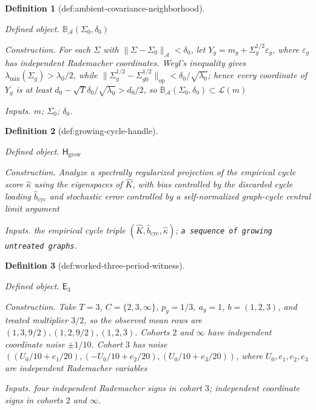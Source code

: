\documentclass{article}
\newtheorem{definition}{Definition}
\begin{document}
\begin{definition}[def:ambient-covariance-neighborhood]\label{def:ambient-covariance-neighborhood}
\par\smallskip\noindent\emph{Defined object.} \(\mathbb B_{\mathcal A}(\Sigma_0,\delta_0)\)
\par\smallskip\noindent\emph{Construction.} For each \(\Sigma\) with \(\|\Sigma-\Sigma_0\|_{\mathcal A}<\delta_0\), let \(Y_g=m_g+\Sigma_g^{1/2}\varepsilon_g\), where \(\varepsilon_g\) has independent Rademacher coordinates. Weyl's inequality gives \(\lambda_{\min}(\Sigma_g)>\lambda_0/2\), while \(\|\Sigma_g^{1/2}-\Sigma_{g0}^{1/2}\|_{\mathrm{op}}<\delta_0/\sqrt{\lambda_0}\); hence every coordinate of \(Y_g\) is at least \(d_0-\sqrt T\delta_0/\sqrt{\lambda_0}>d_0/2\), so \(\mathbb B_{\mathcal A}(\Sigma_0,\delta_0)\subset\mathcal L(m)\)
\par\smallskip\noindent\emph{Inputs.} \(m\); \(\Sigma_0\); \(\delta_0\).
\end{definition}

\begin{definition}[def:growing-cycle-handle]\label{def:growing-cycle-handle}
\par\smallskip\noindent\emph{Defined object.} \(\mathsf H_{\mathrm{grow}}\)
\par\smallskip\noindent\emph{Construction.} Analyze a spectrally regularized projection of the empirical cycle score \(\widehat\kappa\) using the eigenspaces of \(\widehat K\), with bias controlled by the discarded cycle loading \(\widehat b_{\mathrm{cyc}}\) and stochastic error controlled by a self-normalized graph-cycle central limit argument
\par\smallskip\noindent\emph{Inputs.} the empirical cycle triple \((\widehat K,\widehat b_{\mathrm{cyc}},\widehat\kappa)\); \texttt{a sequence of growing untreated graphs}.
\end{definition}

\begin{definition}[def:worked-three-period-witness]\label{def:worked-three-period-witness}
\par\smallskip\noindent\emph{Defined object.} \(\mathsf E_3\)
\par\smallskip\noindent\emph{Construction.} Take \(T=3\), \(C=\{2,3,\infty\}\), \(p_g=1/3\), \(a_g=1\), \(b=(1,2,3)\), and treated multiplier \(3/2\), so the observed mean rows are \((1,3,9/2),(1,2,9/2),(1,2,3)\). Cohorts \(2\) and \(\infty\) have independent coordinate noise \(\pm1/10\). Cohort \(3\) has noise \(((U_0/10+e_1/20),(-U_0/10+e_2/20),(U_0/10+e_3/20))\), where \(U_0,e_1,e_2,e_3\) are independent Rademacher variables
\par\smallskip\noindent\emph{Inputs.} four independent Rademacher signs in cohort \(3\); independent coordinate signs in cohorts \(2\) and \(\infty\).
\end{definition}
\end{document}
